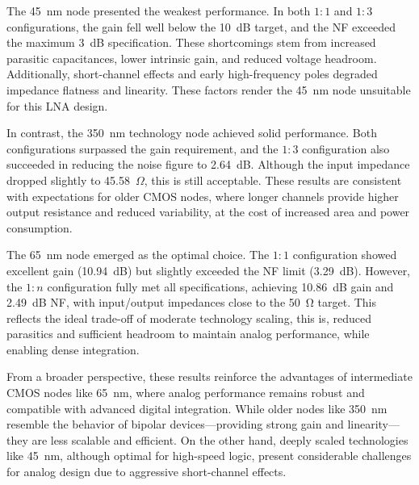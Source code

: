 The 45~nm node presented the weakest performance. In both $1{:}1$ and $1{:}3$ configurations, the gain fell well below the 10~dB target, and the NF exceeded the maximum 3~dB specification. These shortcomings stem from increased parasitic capacitances, lower intrinsic gain, and reduced voltage headroom. Additionally, short-channel effects and early high-frequency poles degraded impedance flatness and linearity. These factors render the 45~nm node unsuitable for this LNA design.

In contrast, the 350~nm technology node achieved solid performance. Both configurations surpassed the gain requirement, and the $1{:}3$ configuration also succeeded in reducing the noise figure to 2.64~dB. Although the input impedance dropped slightly to 45.58~$\Omega$, this is still acceptable. These results are consistent with expectations for older CMOS nodes, where longer channels provide higher output resistance and reduced variability, at the cost of increased area and power consumption.

The 65~nm node emerged as the optimal choice. The $1{:}1$ configuration showed excellent gain (10.94~dB) but slightly exceeded the NF limit (3.29~dB). However, the $1{:}n$ configuration fully met all specifications, achieving 10.86~dB gain and 2.49~dB NF, with input/output impedances close to the \SI{50}{\ohm} target. This reflects the ideal trade-off of moderate technology scaling, this is,  reduced parasitics and sufficient headroom to maintain analog performance, while enabling dense integration.

From a broader perspective, these results reinforce the advantages of intermediate CMOS nodes like 65~nm, where analog performance remains robust and compatible with advanced digital integration. While older nodes like 350~nm resemble the behavior of bipolar devices—providing strong gain and linearity—they are less scalable and efficient. On the other hand, deeply scaled technologies like 45~nm, although optimal for high-speed logic, present considerable challenges for analog design due to aggressive short-channel effects.

